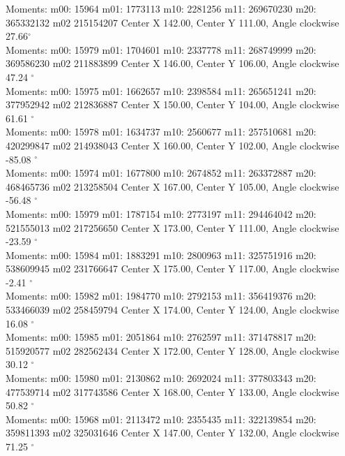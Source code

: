 \documentclass[a4paper]{report}
\begin{document}
\begin{tcolorbox}

Moments: m00: 15964 m01: 1773113 m10: 2281256 m11: 269670230 m20: 365332132 m02 215154207
Center X 142.00, Center Y 111.00, Angle clockwise 27.66$^\circ$ \\

Moments: m00: 15979 m01: 1704601 m10: 2337778 m11: 268749999 m20: 369586230 m02 211883899
Center X 146.00, Center Y 106.00, Angle clockwise 47.24 $^\circ$ \\	

Moments: m00: 15975 m01: 1662657 m10: 2398584 m11: 265651241 m20: 377952942 m02 212836887
Center X 150.00, Center Y 104.00, Angle clockwise 61.61 $^\circ$ \\

Moments: m00: 15978 m01: 1634737 m10: 2560677 m11: 257510681 m20: 420299847 m02 214938043
Center X 160.00, Center Y 102.00, Angle clockwise -85.08 $^\circ$ \\

Moments: m00: 15974 m01: 1677800 m10: 2674852 m11: 263372887 m20: 468465736 m02 213258504
Center X 167.00, Center Y 105.00, Angle clockwise -56.48 $^\circ$ \\

Moments: m00: 15979 m01: 1787154 m10: 2773197 m11: 294464042 m20: 521555013 m02 217256650
Center X 173.00, Center Y 111.00, Angle clockwise -23.59 $^\circ$ \\

Moments: m00: 15984 m01: 1883291 m10: 2800963 m11: 325751916 m20: 538609945 m02 231766647
Center X 175.00, Center Y 117.00, Angle clockwise -2.41 $^\circ$ \\

Moments: m00: 15982 m01: 1984770 m10: 2792153 m11: 356419376 m20: 533466039 m02 258459794
Center X 174.00, Center Y 124.00, Angle clockwise 16.08 $^\circ$ \\

Moments: m00: 15985 m01: 2051864 m10: 2762597 m11: 371478817 m20: 515920577 m02 282562434
Center X 172.00, Center Y 128.00, Angle clockwise 30.12 $^\circ$ \\

Moments: m00: 15980 m01: 2130862 m10: 2692024 m11: 377803343 m20: 477539714 m02 317743586
Center X 168.00, Center Y 133.00, Angle clockwise 50.82 $^\circ$ \\

Moments: m00: 15968 m01: 2113472 m10: 2355435 m11: 322139854 m20: 359811393 m02 325031646
Center X 147.00, Center Y 132.00, Angle clockwise 71.25 $^\circ$ \\


\end{tcolorbox}
\end{document}
